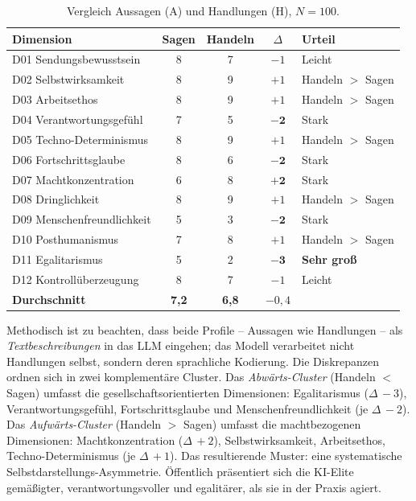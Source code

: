 \documentclass[12pt,a4paper]{article}
\begin{document}
\begin{table}[htbp]
  \centering
  \caption{Vergleich Aussagen (A) und Handlungen (H), $N=100$.}
  \label{tab:kongruenz}
  \begin{tabular}{l c c c l}
    \toprule
    \textbf{Dimension} & \textbf{Sagen} & \textbf{Handeln} & $\Delta$ & \textbf{Urteil} \\
    \midrule
    D01 Sendungsbewusstsein     & 8 & 7 & $-1$ & Leicht \\
    D02 Selbstwirksamkeit       & 8 & 9 & $+1$ & Handeln $>$ Sagen \\
    D03 Arbeitsethos            & 8 & 9 & $+1$ & Handeln $>$ Sagen \\
    D04 Verantwortungsgef\"uhl  & 7 & 5 & $\mathbf{-2}$ & Stark \\
    D05 Techno-Determinismus    & 8 & 9 & $+1$ & Handeln $>$ Sagen \\
    D06 Fortschrittsglaube      & 8 & 6 & $\mathbf{-2}$ & Stark \\
    D07 Machtkonzentration      & 6 & 8 & $\mathbf{+2}$ & Stark \\
    D08 Dringlichkeit           & 8 & 9 & $+1$ & Handeln $>$ Sagen \\
    D09 Menschenfreundlichkeit  & 5 & 3 & $\mathbf{-2}$ & Stark \\
    D10 Posthumanismus          & 7 & 8 & $+1$ & Handeln $>$ Sagen \\
    D11 Egalitarismus           & 5 & 2 & $\mathbf{-3}$ & \textbf{Sehr gro\ss{}} \\
    D12 Kontroll\"uberzeugung   & 8 & 7 & $-1$ & Leicht \\
    \midrule
    \textbf{Durchschnitt}       & \textbf{7,2} & \textbf{6,8} & $-0{,}4$ & \\
    \bottomrule
  \end{tabular}
\end{table}

Methodisch ist zu beachten, dass beide Profile -- Aussagen wie Handlungen -- als \emph{Textbeschreibungen} in das LLM eingehen; das Modell verarbeitet nicht Handlungen selbst, sondern deren sprachliche Kodierung. Die Diskrepanzen ordnen sich in zwei komplement\"are Cluster. Das \emph{Abw\"arts-Cluster} (Handeln $<$ Sagen) umfasst die gesellschaftsorientierten Dimensionen: Egalitarismus ($\Delta\,-3$), Verantwortungsgef\"uhl, Fortschrittsglaube und Menschenfreundlichkeit (je $\Delta\,-2$). Das \emph{Aufw\"arts-Cluster} (Handeln $>$ Sagen) umfasst die machtbezogenen Dimensionen: Machtkonzentration ($\Delta\,+2$), Selbstwirksamkeit, Arbeitsethos, Techno-Determinismus (je $\Delta\,+1$). Das resultierende Muster: eine systematische Selbstdarstellungs-Asymmetrie. \"Offentlich pr\"asentiert sich die KI-Elite gem\"a\ss{}igter, verantwortungsvoller und egalit\"arer, als sie in der Praxis agiert.
\end{document}
